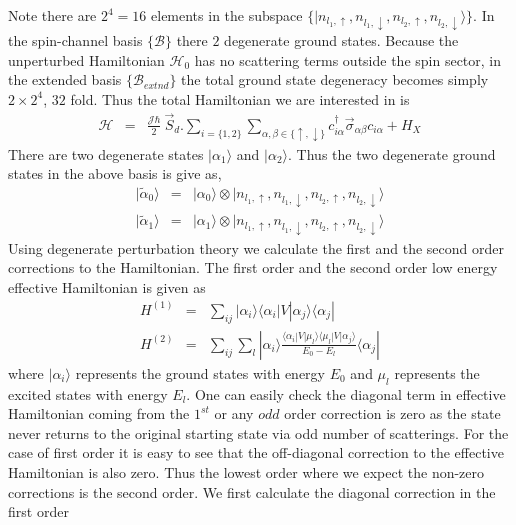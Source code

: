 \documentclass[reprint,prb,superscriptaddress]{revtex4-2}
\begin{document}
Note there are $2^4=16$ elements in the subspace $\{|n_{l_1,\uparrow},n_{l_1,\downarrow},n_{l_2,\uparrow},n_{l_2,\downarrow}\rangle\}$. In the spin-channel basis $\{\mathcal{B}\}$ there $2$ degenerate ground states. Because the unperturbed Hamiltonian $\mathcal{H}_0$ has no scattering terms outside the spin sector, in the extended basis $\{\mathcal{B}_{extnd}\}$ the total ground state degeneracy becomes simply $2\times 2^4$, $32$ fold. Thus the total Hamiltonian we are interested in is 
\begin{eqnarray}
\mathcal{H} &=& \frac{{\mathcal{J}}\hbar}{2}~ \vec{S}_d. \displaystyle\sum_{i=\{1,2\}} \displaystyle\sum_{\alpha,\beta\in\{\uparrow,\downarrow\}}c_{i\alpha}^{\dagger} \vec{\sigma}_{\alpha\beta} c_{i\alpha} +H_X
\label{eq:excitation_hamiltonian}
\end{eqnarray}
There are two degenerate states $|\alpha_1\rangle$ and $|\alpha_2\rangle$. Thus the two degenerate ground states in the above basis is give as,
\begin{eqnarray}
|\tilde{\alpha}_0\rangle &=&| {\alpha}_0\rangle\otimes |n_{l_1,\uparrow},n_{l_1,\downarrow},n_{l_2,\uparrow},n_{l_2,\downarrow}\rangle \\
|\tilde{\alpha}_1\rangle &=& | {\alpha}_1\rangle\otimes |n_{l_1,\uparrow},n_{l_1,\downarrow},n_{l_2,\uparrow},n_{l_2,\downarrow}\rangle
\end{eqnarray}
Using degenerate perturbation theory we calculate the first and the second order corrections to the Hamiltonian. The first order and the second order low energy effective Hamiltonian is given as 
\begin{eqnarray}
H^{(1)} &=& \sum_{ij} |\alpha_i\rangle \langle \alpha_i  | V| \alpha_j \rangle \langle \alpha_j |~\nonumber\\
H^{(2)} &=& \sum_{ij} \sum_l |\alpha_i\rangle \frac{\langle \alpha_i  | V| \mu_l \rangle \langle \mu_l  | V| \alpha_j \rangle}{E_0-E_{l}}\langle \alpha_j |
\end{eqnarray}
where $|\alpha_i\rangle$ represents the ground states with energy $E_0$ and $\mu_l$ represents the excited states with energy $E_l$. One can easily check the diagonal term in effective Hamiltonian coming from the $1^{st}$ or any $odd$ order correction is zero as the state never returns to the original starting state via odd number of scatterings. For the case of first order it is easy to see that the off-diagonal correction to the effective Hamiltonian is also zero. Thus the lowest order where we expect the non-zero corrections is the second order. We first calculate the diagonal correction in the first order
\end{document}
